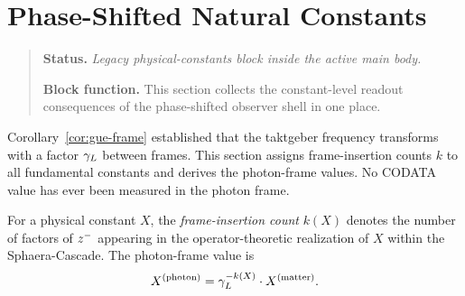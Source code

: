 
\section{Phase-Shifted Natural Constants}
\begin{quote}\small
\noindent\textbf{Status.} \emph{Legacy physical-constants block inside the active main body.}\par
\noindent\textbf{Block function.} This section collects the constant-level readout consequences of the phase-shifted observer shell in one place.
\end{quote}
\label{sec:phase-constants}

\begin{remark}
Corollary~\ref{cor:gue-frame} established that the taktgeber frequency
transforms with a factor $\gamma_L$ between frames.
This section assigns frame-insertion counts $k$ to all fundamental
constants and derives the photon-frame values.
No CODATA value has ever been measured in the photon frame.
\end{remark}


\begin{definition}
For a physical constant $X$, the \emph{frame-insertion count} $k(X)$ denotes
 the number of factors of $z^-$ appearing in the operator-theoretic
 realization of $X$ within the Sphaera-Cascade.
The photon-frame value is
\[
 X^{(\mathrm{photon})} = \gamma_L^{-k(X)}\cdot X^{(\mathrm{matter})}.
\]
\end{definition}

